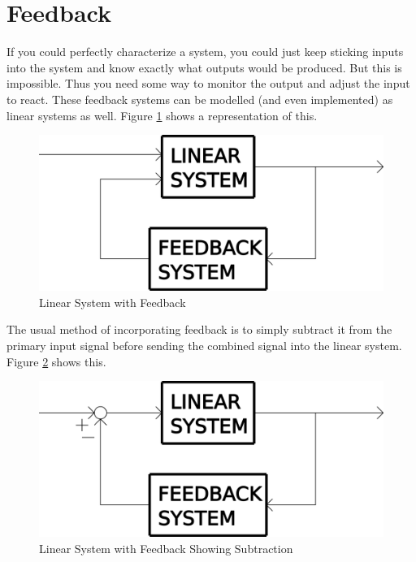 \section{Feedback}

If you could perfectly characterize a system, you could just keep sticking inputs into the system and know exactly what outputs would be produced. But this is impossible. Thus you need some way to monitor the output and adjust the input to react. These feedback systems can be modelled (and even implemented) as linear systems as well. Figure \ref{feedback_box} shows a representation of this.

\begin{figure}[h]
\centering
\includegraphics[scale=1.0]{feedback_box.png}
\caption{Linear System with Feedback}\label{feedback_box}
\end{figure}


The usual method of incorporating feedback is to simply subtract it from the primary input signal before sending the combined signal into the linear system. Figure \ref{feedback_box_2} shows this.

\begin{figure}[h]
\centering
\includegraphics[scale=1.0]{feedback_box_2.png}
\caption{Linear System with Feedback Showing Subtraction}\label{feedback_box_2}
\end{figure}
